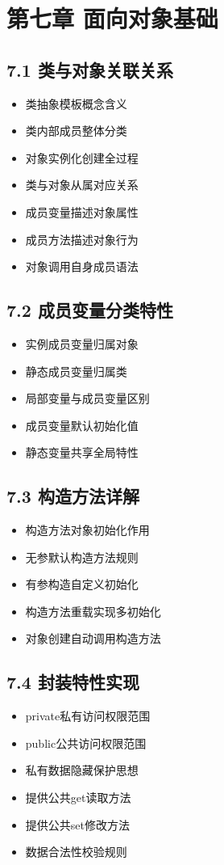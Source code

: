 \section{第七章 面向对象基础}
\subsection{7.1 类与对象关联关系}
\begin{itemize}
\item 类抽象模板概念含义
\item 类内部成员整体分类
\item 对象实例化创建全过程
\item 类与对象从属对应关系
\item 成员变量描述对象属性
\item 成员方法描述对象行为
\item 对象调用自身成员语法
\end{itemize}

\subsection{7.2 成员变量分类特性}
\begin{itemize}
\item 实例成员变量归属对象
\item 静态成员变量归属类
\item 局部变量与成员变量区别
\item 成员变量默认初始化值
\item 静态变量共享全局特性
\end{itemize}

\subsection{7.3 构造方法详解}
\begin{itemize}
\item 构造方法对象初始化作用
\item 无参默认构造方法规则
\item 有参构造自定义初始化
\item 构造方法重载实现多初始化
\item 对象创建自动调用构造方法
\end{itemize}

\subsection{7.4 封装特性实现}
\begin{itemize}
\item private私有访问权限范围
\item public公共访问权限范围
\item 私有数据隐藏保护思想
\item 提供公共get读取方法
\item 提供公共set修改方法
\item 数据合法性校验规则
\end{itemize}

